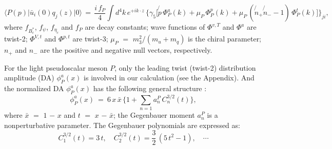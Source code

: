 \documentclass[preprint,superscriptaddress,nofootinbib]{revtex4}
\begin{document}
  \begin{equation}
 {\langle}P(p){\vert}\bar{u}_{i}(0)q_{j}(z){\vert}0{\rangle}\,
 =\, \frac{i\,f_{P}}{4}{\int}d^{4}k\,e^{+ik{\cdot}z}\,
  \Big\{ {\gamma}_{5}\Big[ \!\!\not{p}\,{\Phi}_{P}^{a}(k) +
 {\mu}_{P}\,{\Phi}_{P}^{p}(k) +
 {\mu}_{P}\,(\not{n}_{+}\!\!\not{n}_{-}-1)\,{\Phi}_{P}^{t}(k)
  \Big] \Big\}_{ji}
  \label{wf-pi},
  \end{equation}
  where $f_{B_{c}^{\ast}}$, $f_{\psi}$, $f_{{\eta}_{c}}$ and $f_{P}$
  are decay constants;
  wave functions of ${\Phi}^{v,T}$ and ${\Phi}^{a}$ are twist-2;
  ${\Phi}^{V,t}$ and ${\Phi}^{p,t}$ are twist-3;
  ${\mu}_{P}$ $=$ $m_{3}^{2}/(m_{u}+m_{q})$ is the chiral parameter;
  $n_{+}$ and $n_{-}$ are the positive and negative null vectors,
  respectively.

  For the light pseudoscalar meson $P$, only the leading twist
  (twist-2) distribution amplitude (DA) ${\phi}_{P}^{a}(x)$ is involved in
  our calculation (see the Appendix). And the normalized DA ${\phi}_{P}^{a}(x)$
  has the following general structure \cite{jhep.0605.004}:
  \begin{equation}
 {\phi}_{P}^{a}(x)\ =\ 6\,x\,\bar{x}\,
  \Big\{ 1+ \sum\limits_{n=1}
   a_{n}^{P}\, C_{n}^{3/2}(t) \Big\}
  \label{da-pi},
  \end{equation}
  where $\bar{x}$ $=$ $1$ $-$ $x$ and $t$ $=$ $x$ $-$ $\bar{x}$;
  the Gegenbauer moment $a_{n}^{P}$ is a nonperturbative parameter.
  The Gegenbauer polynomials are expressed as:
  \begin{equation}
  C_{1}^{3/2}(t) = 3\,t,
  \quad
  C_{2}^{3/2}(t) = \frac{3}{2}\,(5\,t^{2}-1),
  \quad
  {\cdots}
  \label{polynomials}
  \end{equation}
\end{document}
